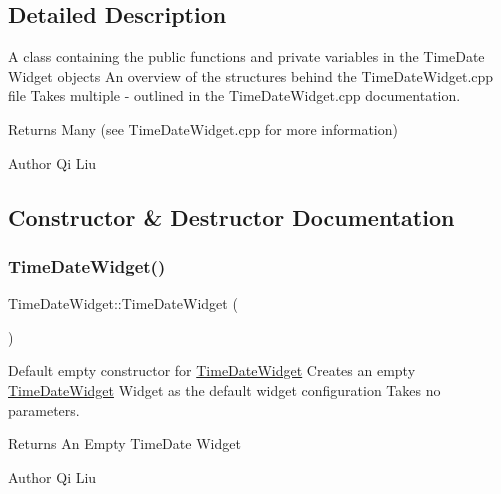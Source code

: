 \subsection{Detailed Description}
A class containing the public functions and private variables in the Time\+Date Widget objects  An overview of the structures behind the Time\+Date\+Widget.\+cpp file  Takes multiple -\/ outlined in the Time\+Date\+Widget.\+cpp documentation. 

\begin{DoxyReturn}{Returns}
Many (see Time\+Date\+Widget.\+cpp for more information) 
\end{DoxyReturn}
\begin{DoxyAuthor}{Author}
Qi Liu 
\end{DoxyAuthor}


\subsection{Constructor \& Destructor Documentation}
\mbox{\label{class_time_date_widget_a661a209376b099776bdb2cdf3b29b7be}} 
\subsubsection{\texorpdfstring{Time\+Date\+Widget()}{TimeDateWidget()}}
{\footnotesize\ttfamily Time\+Date\+Widget\+::\+Time\+Date\+Widget (\begin{DoxyParamCaption}{ }\end{DoxyParamCaption})}



Default empty constructor for \mbox{\hyperlink{class_time_date_widget}{Time\+Date\+Widget}}  Creates an empty \mbox{\hyperlink{class_time_date_widget}{Time\+Date\+Widget}} Widget as the default widget configuration  Takes no parameters. 

\begin{DoxyReturn}{Returns}
An Empty Time\+Date Widget 
\end{DoxyReturn}
\begin{DoxyAuthor}{Author}
Qi Liu 
\end{DoxyAuthor}
\mbox{\label{class_time_date_widget_aa52cfdaaa44a82ef169b2f368130e1de}} 
